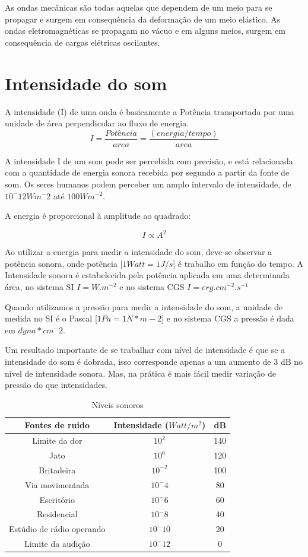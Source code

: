 \documentclass[
	article,			%
	11pt,				%
	oneside,			%
	a4paper,			%
	english,			%
	brazil,				%
	sumario=tradicional
	]{abntex2}
\begin{document}
As ondas mecânicas são todas aquelas que dependem de um meio para se propagar e surgem em consequência da deformação de um meio elástico.
As ondas eletromagnéticas se propagam no vácuo e em alguns meios, surgem em consequência de cargas elétricas oscilantes\cite{demodelo}.

\section*{Intensidade do som}
A intensidade (I) de uma onda é basicamente a Potência transportada por uma unidade de área perpendicular ao
fluxo de energia.
$$I = \frac{Potência}{area} = \frac{(energia / tempo)} {area}$$

A intensidade I de um som pode ser percebida com precisão, e está relacionada com a quantidade de energia sonora recebida por segundo a partir da fonte de som. Os seres humanos podem perceber um amplo intervalo de intensidade, de $10^-12 Wm^-2$ até $100 Wm^{-2}$.

\begin{center}
    A energia é proporcional à amplitude ao quadrado:
\end{center}
$$I \propto A^2$$

Ao utilizar a energia para medir a intensidade do som, deve-se observar a potência sonora, onde potência [$1 Watt=1 J/s$] é trabalho em função do tempo. A Intensidade sonora é estabelecida pela potência aplicada em uma determinada área, no sistema SI $I=W.m^{-2}$ e no sistema CGS $I= erg.cm^{-2}.s^{-1}$

Quando utilizamos a pressão para medir a intensidade do som, a unidade de medida no SI é o Pascal [$1 Pa= 1 N*m-2$] e no sistema CGS a pressão é dada em $dyna*cm^-2$.

Um resultado importante de se trabalhar com nível de intensidade é que se a intensidade do som é dobrada, isso corresponde apenas a um aumento de 3 dB no nível de intensidade sonora. Mas, na prática é mais fácil medir variação de pressão do que intensidades.

\begin{table}[hb]
\centering
    \begin{tabular}{c  c  c}
Fontes de ruido & Intensidade ($Watt/m^2$) & dB\\ 
\hline
Limite da dor & $10^2$ & 140\\
\hline
Jato & $10^0$ & 120\\
\hline
Britadeira & $10^{-2}$ & 100\\
\hline
Via movimentada & $10^-4$ & 80\\
\hline
Escritório & $10^-6$ & 60\\
\hline
Residencial & $10^-8$ & 40\\
\hline
Estúdio de rádio operando & $10^-10$ & 20\\
\hline
Limite da audição & $10^-12$ & 0\\
\hline
    \end{tabular}
    \caption{Níveis sonoros}
\end{table}
\end{document}
